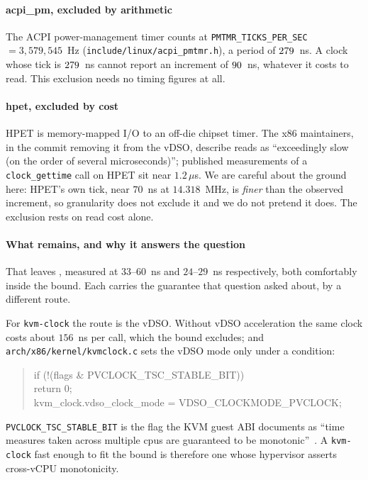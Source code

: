 \documentclass[10pt,journal,onecolumn]{IEEEtran}
\begin{document}
\paragraph{acpi\_pm, excluded by arithmetic}
The ACPI power-management timer counts at \texttt{PMTMR\_TICKS\_PER\_SEC} $= 3{,}579{,}545$~Hz
(\texttt{include/linux/acpi\_pmtmr.h}), a period of $279$~ns. A clock whose tick is
$279$~ns cannot report an increment of $90$~ns, whatever it costs to
read. This exclusion needs no timing figures at all.

\paragraph{hpet, excluded by cost}
HPET is memory-mapped I/O to an off-die chipset timer. The x86 maintainers, in the commit
removing it from the vDSO, describe reads as ``exceedingly slow (on the order of several
microseconds)''; published measurements of a \texttt{clock\_gettime} call on HPET sit near
$1.2\,\mu$s. We are careful about the ground here: HPET's own tick, near $70$~ns at
$14.318$~MHz, is \emph{finer} than the observed increment, so granularity does not exclude it
and we do not pretend it does. The exclusion rests on read cost alone.

\paragraph{What remains, and why it answers the question}
That leaves \clockAdmitted{}, measured at $33$--$60$~ns and $24$--$29$~ns respectively, both
comfortably inside the bound. Each carries the guarantee that question asked about, by a
different route.

For \texttt{kvm-clock} the route is the vDSO. Without vDSO acceleration the same clock costs
about $156$~ns per call, which the bound excludes; and \texttt{arch/x86/kernel/kvmclock.c}
sets the vDSO mode only under a condition:
%
\begin{quote}
\ttfamily\small
if (!(flags \& PVCLOCK\_TSC\_STABLE\_BIT))\\
\hspace*{2em}return 0;\\
kvm\_clock.vdso\_clock\_mode = VDSO\_CLOCKMODE\_PVCLOCK;
\end{quote}
%
\texttt{PVCLOCK\_TSC\_STABLE\_BIT} is the flag the KVM guest ABI documents as ``time measures
taken across multiple cpus are guaranteed to be monotonic''~\cite{kvmclock}. A
\texttt{kvm-clock} fast enough to fit the bound is therefore one whose hypervisor asserts
cross-vCPU monotonicity.
\end{document}
